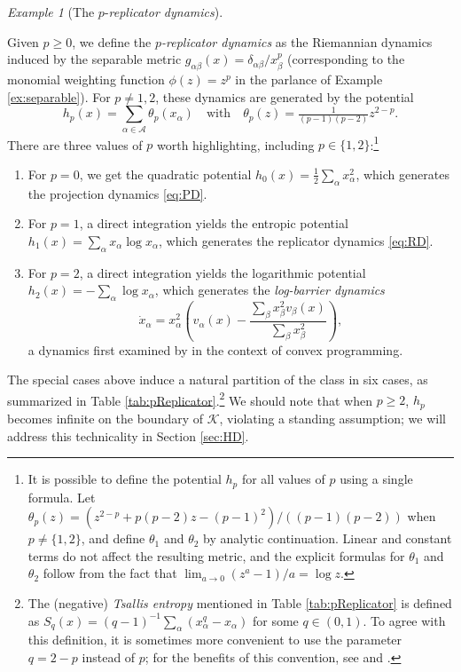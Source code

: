 \documentclass[reqno]{amsart}
\theoremstyle{plain}
\theoremstyle{definition}
\theoremstyle{remark}
\newtheorem{example}[theorem]{Example}
\numberwithin{equation}{section}
\numberwithin{theorem}{section}
\begin{document}
\begin{example}
[The $p$-\emph{replicator dynamics}]
\label{ex:pReplicator}

Given $p\geq 0$, we define the \emph{$p$-replicator dynamics} as the Riemannian dynamics
induced by the separable metric $g_{\alpha\beta}(x) = \delta_{\alpha\beta}/x_{\beta}^{p}$ (corresponding to the monomial weighting function ${\phi}(z) = z^{p}$ in the parlance of Example \ref{ex:separable}).
For $p \neq1,2$, these dynamics are generated by the potential 
\begin{equation}
\label{eq:hp}
h_{p}(x) = \sum_{\alpha\in{\mathcal{A}}} \theta_{p}(x_{\alpha})
	\quad
	\text{with}
	\quad
	\theta_p(z)
= \tfrac{1}{(p-1)(p-2)}z^{2-p}.
\end{equation}
There are three values of $p$ worth highlighting, including $p\in\{1,2\}$:\footnote{It is possible to define the potential $h_{p}$ for all values of $p$ using a single formula.
Let $\theta_p(z) = (z^{2-p} + p(p-2)z - (p-1)^{2})/((p-1)(p-2))$ when $p \ne \{1, 2\}$, and define $\theta_1$ and $\theta_2$ by analytic continuation.  Linear and constant terms do not affect the resulting metric, and the explicit formulas for $\theta_1$ and $\theta_2$ follow from the fact that $\lim_{a \to 0} (z^{a} - 1)/a = \log z$.}

\begin{enumerate}
\item
For $p=0$, we get the quadratic potential $h_0(x)=\frac{1}{2} \sum_{\alpha} x_{\alpha}^{2}$, which generates the projection dynamics \eqref{eq:PD}.

\item
For $p=1$, a direct integration yields the entropic potential $h_1(x)=\sum_{\alpha} x_{\alpha} \log x_{\alpha}$, which generates the rep\-li\-ca\-tor dynamics \eqref{eq:RD}.

\item
For $p=2$, a direct integration yields the logarithmic potential $h_2(x)=- \sum_{\alpha} \log x_{\alpha}$, which generates the \emph{log-barrier dynamics}
\begin{equation}
\label{eq:LD}
\tag{LD}
\dot x_{\alpha}
	= x_{\alpha}^{2} \left( {v}_{\alpha}(x) - \frac{\sum_{\beta} x_{\beta}^{2} {v}_{\beta}(x)}{\sum_{\beta} x_{\beta}^{2}}\right),
\end{equation}
a dynamics first examined by \cite{BL89} in the context of convex programming.
\end{enumerate}
The special cases above induce a natural partition of the class in six cases, as summarized in Table \ref{tab:pReplicator}.\footnote{The (negative) \emph{Tsallis entropy} \citep{Tsa88} mentioned in Table \ref{tab:pReplicator} is defined as $S_{q}(x) = (q-1)^{-1} \sum_{\alpha} (x_{\alpha}^{q} - x_{\alpha})$ for some $q\in(0,1)$.
To agree with this definition, it is sometimes more convenient to use the parameter $q = 2-p$ instead of $p$;
for the benefits of this convention, see \cite{Har11} and \cite{MS16}.}
We should note that when $p\geq2$, $h_{p}$ becomes infinite on the boundary of ${\mathcal{K}}$, violating a standing assumption;
we will address this technicality in Section \ref{sec:HD}.


\end{example}
\end{document}
